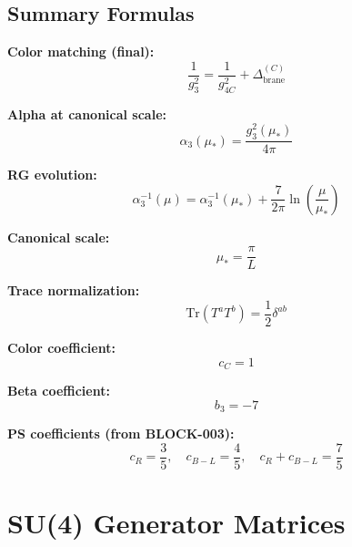\documentclass[11pt,a4paper]{article}
\theoremstyle{definition}
\begin{document}
\subsection{Summary Formulas}
\label{subsec:summary-formulas}

\textbf{Color matching (final):}
\begin{equation}
  \label{eq:summary-color}
  \frac{1}{g_3^2} = \frac{1}{g_{4C}^2} + \Delta_{\text{brane}}^{(C)}
\end{equation}

\textbf{Alpha at canonical scale:}
\begin{equation}
  \label{eq:summary-alpha}
  \alpha_3(\mu_*) = \frac{g_3^2(\mu_*)}{4\pi}
\end{equation}

\textbf{RG evolution:}
\begin{equation}
  \label{eq:summary-rg}
  \alpha_3^{-1}(\mu) = \alpha_3^{-1}(\mu_*) + \frac{7}{2\pi}\ln\left(\frac{\mu}{\mu_*}\right)
\end{equation}

\textbf{Canonical scale:}
\begin{equation}
  \label{eq:summary-mustar}
  \mu_* = \frac{\pi}{L}
\end{equation}

\textbf{Trace normalization:}
\begin{equation}
  \label{eq:summary-trace}
  \text{Tr}(T^a T^b) = \frac{1}{2}\delta^{ab}
\end{equation}

\textbf{Color coefficient:}
\begin{equation}
  \label{eq:summary-cc}
  c_C = 1
\end{equation}

\textbf{Beta coefficient:}
\begin{equation}
  \label{eq:summary-b3}
  b_3 = -7
\end{equation}

\textbf{PS coefficients (from BLOCK-003):}
\begin{equation}
  \label{eq:summary-ps}
  c_R = \frac{3}{5}, \quad c_{B-L} = \frac{4}{5}, \quad c_R + c_{B-L} = \frac{7}{5}
\end{equation}

\newpage

\appendix
\section{SU(4) Generator Matrices}
\label{app:generators}
\end{document}
